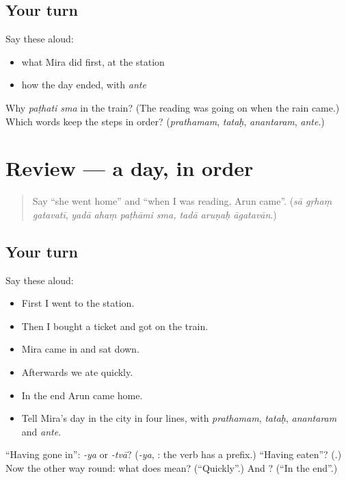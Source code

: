 \subsection*{Your turn}
Say these aloud:

\begin{itemize}
\raggedright
  \item what Mira did first, at the station
  \item how the day ended, with \emph{ante}
\end{itemize}

\begin{tcolorbox}[breakable,colback=teal!4,colframe=teal!35!black,title={Before you move on}]
Why \emph{paṭhati sma} in the train? (The reading was going on when the rain came.) Which words keep the steps in order? (\emph{prathamam}, \emph{tataḥ}, \emph{anantaram}, \emph{ante}.)
\end{tcolorbox}
\section[(review)]{Review — a day, in order}

\label{lesson:SA-R277-a-day-in-order}



\begin{quote}
Say \textquotedblleft{}she went home\textquotedblright{} and \textquotedblleft{}when I was reading, Arun came\textquotedblright{}. (\emph{sā gṛhaṃ gatavatī}, \emph{yadā ahaṃ paṭhāmi sma, tadā aruṇaḥ āgatavān}.)
\end{quote}

\subsection*{Your turn}
Say these aloud:

\begin{itemize}
\raggedright
  \item First I went to the station.
  \item Then I bought a ticket and got on the train.
  \item Mira came in and sat down.
  \item Afterwards we ate quickly.
  \item In the end Arun came home.
  \item Tell Mira's day in the city in four lines, with \emph{prathamam}, \emph{tataḥ}, \emph{anantaram} and \emph{ante}.
\end{itemize}

\begin{tcolorbox}[breakable,colback=teal!4,colframe=teal!35!black,title={Before you move on}]
\textquotedblleft{}Having gone in\textquotedblright{}: \emph{-ya} or \emph{-tvā}? (\emph{-ya}, \textbf{}: the verb has a prefix.) \textquotedblleft{}Having eaten\textquotedblright{}? (\textbf{}.) Now the other way round: what does \textbf{} mean? (\textquotedblleft{}Quickly\textquotedblright{}.) And \textbf{}? (\textquotedblleft{}In the end\textquotedblright{}.)
\end{tcolorbox}
